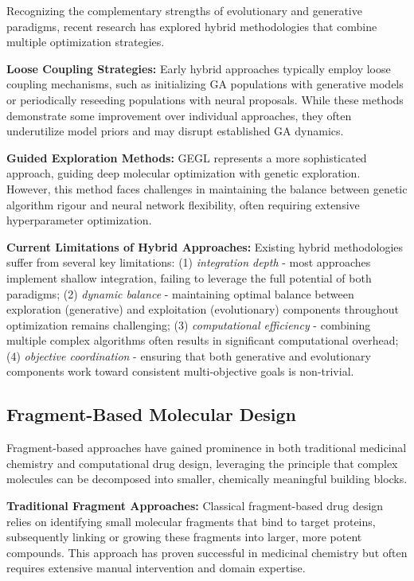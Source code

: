 \documentclass[lettersize,journal]{IEEEtran}
\begin{document}
Recognizing the complementary strengths of evolutionary and generative paradigms, recent research has explored hybrid methodologies that combine multiple optimization strategies.

\noindent \textbf{Loose Coupling Strategies:} Early hybrid approaches typically employ loose coupling mechanisms, such as initializing GA populations with generative models or periodically reseeding populations with neural proposals. While these methods demonstrate some improvement over individual approaches, they often underutilize model priors and may disrupt established GA dynamics.

\noindent \textbf{Guided Exploration Methods:} GEGL \cite{ahnGuidingDeepMolecular2020} represents a more sophisticated approach, guiding deep molecular optimization with genetic exploration. However, this method faces challenges in maintaining the balance between genetic algorithm rigour and neural network flexibility, often requiring extensive hyperparameter optimization.

\noindent \textbf{Current Limitations of Hybrid Approaches:} Existing hybrid methodologies suffer from several key limitations: (1) \textit{integration depth} - most approaches implement shallow integration, failing to leverage the full potential of both paradigms; (2) \textit{dynamic balance} - maintaining optimal balance between exploration (generative) and exploitation (evolutionary) components throughout optimization remains challenging; (3) \textit{computational efficiency} - combining multiple complex algorithms often results in significant computational overhead; (4) \textit{objective coordination} - ensuring that both generative and evolutionary components work toward consistent multi-objective goals is non-trivial.

\subsection{Fragment-Based Molecular Design}

Fragment-based approaches have gained prominence in both traditional medicinal chemistry and computational drug design, leveraging the principle that complex molecules can be decomposed into smaller, chemically meaningful building blocks.

\noindent \textbf{Traditional Fragment Approaches:} Classical fragment-based drug design relies on identifying small molecular fragments that bind to target proteins, subsequently linking or growing these fragments into larger, more potent compounds. This approach has proven successful in medicinal chemistry but often requires extensive manual intervention and domain expertise.
\end{document}

